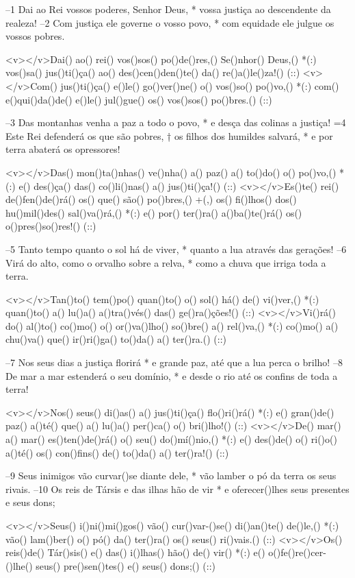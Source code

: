 –1 Dai ao Rei vossos poderes, Senhor Deus, *
vossa justiça ao descendente da realeza!
–2 Com justiça ele governe o vosso povo, *
com equidade ele julgue os vossos pobres.

<v></v>Dai() ao() rei() vos()sos() po()de()res,() Se()nhor() Deus,() *(:)
vos()sa() jus()ti()ça() ao() des()cen()den()te() da() re()a()le()za!() (::)
<v></v>Com() jus()ti()ça() e()le() go()ver()ne() o() vos()so() po()vo,() *(:)
com() e()qui()da()de() e()le() jul()gue() os() vos()sos() po()bres.() (::)

–3 Das montanhas venha a paz a todo o povo, *
e desça das colinas a justiça!
=4 Este Rei defenderá os que são pobres, †
os filhos dos humildes salvará, *
e por terra abaterá os opressores!

<v></v>Das() mon()ta()nhas() ve()nha() a() paz() a() to()do() o() po()vo,() *(:)
e() des()ça() das() co()li()nas() a() jus()ti()ça!() (::)
<v></v>Es()te() rei() de()fen()de()rá() os() que() são() po()bres,() +(,)
os() fi()lhos() dos() hu()mil()des() sal()va()rá,() *(:)
e() por() ter()ra() a()ba()te()rá() os() o()pres()so()res!() (::)

–5 Tanto tempo quanto o sol há de viver, *
quanto a lua através das gerações!
–6 Virá do alto, como o orvalho sobre a relva, *
como a chuva que irriga toda a terra.

<v></v>Tan()to() tem()po() quan()to() o() sol() há() de() vi()ver,() *(:)
quan()to() a() lu()a() a()tra()vés() das() ge()ra()ções!() (::)
<v></v>Vi()rá() do() al()to() co()mo() o() or()va()lho() so()bre() a() rel()va,() *(:)
co()mo() a() chu()va() que() ir()ri()ga() to()da() a() ter()ra.() (::)

–7 Nos seus dias a justiça florirá *
e grande paz, até que a lua perca o brilho!
–8 De mar a mar estenderá o seu domínio, *
e desde o rio até os confins de toda a terra!

<v></v>Nos() seus() di()as() a() jus()ti()ça() flo()ri()rá() *(:)
e() gran()de() paz() a()té() que() a() lu()a() per()ca() o() bri()lho!() (::)
<v></v>De() mar() a() mar() es()ten()de()rá() o() seu() do()mí()nio,() *(:)
e() des()de() o() ri()o() a()té() os() con()fins() de() to()da() a() ter()ra!() (::)

–9 Seus inimigos vão curvar()se diante dele, *
vão lamber o pó da terra os seus rivais.
–10 Os reis de Társis e das ilhas hão de vir *
e oferecer()lhes seus presentes e seus dons;

<v></v>Seus() i()ni()mi()gos() vão() cur()var-()se() di()an()te() de()le,() *(:)
vão() lam()ber() o() pó() da() ter()ra() os() seus() ri()vais.() (::)
<v></v>Os() reis()de() Tár()sis() e() das() i()lhas() hão() de() vir() *(:)
e() o()fe()re()cer-()lhe() seus() pre()sen()tes() e() seus() dons;() (::)

